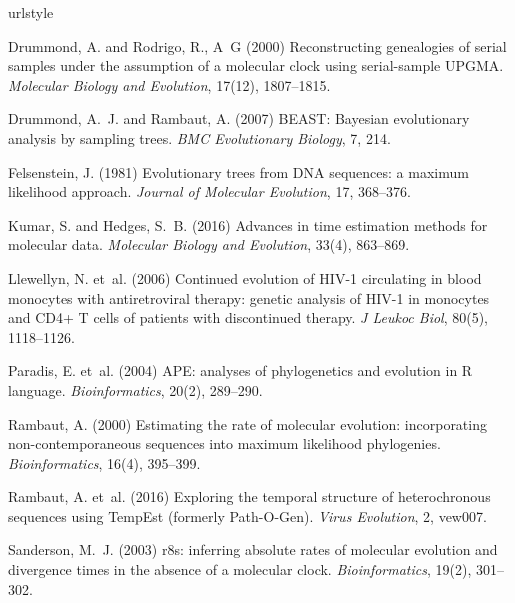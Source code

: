 \documentclass{bioinfo}
\begin{document}

\begin{thebibliography}{14}
\providecommand{\natexlab}[1]{#1}
\providecommand{\url}[1]{\texttt{#1}}
\providecommand{\urlprefix}{URL }
\expandafter\ifx\csname urlstyle\endcsname\relax
  \providecommand{\doi}[1]{doi:\discretionary{}{}{}#1}\else
  \providecommand{\doi}{doi:\discretionary{}{}{}\begingroup
  \urlstyle{rm}\Url}\fi

Drummond, A. and Rodrigo, R., A~G (2000) Reconstructing genealogies of serial
  samples under the assumption of a molecular clock using serial-sample
  {UPGMA}.
\newblock \emph{Molecular Biology and Evolution}, 17(12), 1807--1815.

Drummond, A.~J. and Rambaut, A. (2007) {BEAST}: {Bayesian} evolutionary
  analysis by sampling trees.
\newblock \emph{BMC Evolutionary Biology}, 7, 214.

Felsenstein, J. (1981) Evolutionary trees from {DNA} sequences: a maximum
  likelihood approach.
\newblock \emph{Journal of Molecular Evolution}, 17, 368--376.

Kumar, S. and Hedges, S.~B. (2016) Advances in time estimation methods for
  molecular data.
\newblock \emph{Molecular Biology and Evolution}, 33(4), 863--869.

Llewellyn, N. et~al. (2006) Continued evolution of {HIV-1} circulating in blood
  monocytes with antiretroviral therapy: genetic analysis of {HIV-1} in
  monocytes and {CD4+} {T} cells of patients with discontinued therapy.
\newblock \emph{J Leukoc Biol}, 80(5), 1118--1126.

Paradis, E. et~al. (2004) {APE}: analyses of phylogenetics and evolution in {R}
  language.
\newblock \emph{Bioinformatics}, 20(2), 289--290.

Rambaut, A. (2000) Estimating the rate of molecular evolution: incorporating
  non-contemporaneous sequences into maximum likelihood phylogenies.
\newblock \emph{Bioinformatics}, 16(4), 395--399.

Rambaut, A. et~al. (2016) Exploring the temporal structure of heterochronous
  sequences using {TempEst} (formerly {Path-O-Gen}).
\newblock \emph{Virus Evolution}, 2, vew007.

Sanderson, M.~J. (2003) {r8s}: inferring absolute rates of molecular evolution
  and divergence times in the absence of a molecular clock.
\newblock \emph{Bioinformatics}, 19(2), 301--302.


\end{thebibliography}
\end{document}
